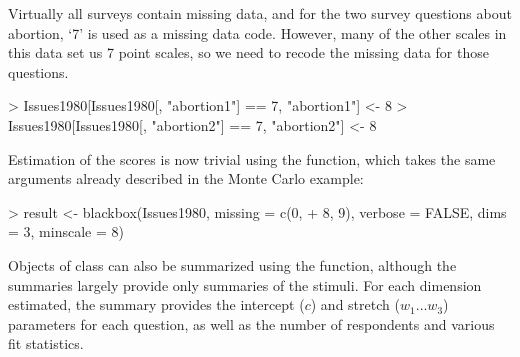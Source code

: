 \documentclass[nojss]{jss}
\begin{document}
Virtually all surveys contain missing data, and for the two survey questions about abortion, `7' is
used as a missing data code. However, many of the other scales in this data set us 7 point scales, so
we need to recode the missing data for those questions.

\begin{Schunk}
\begin{Sinput}
> Issues1980[Issues1980[, "abortion1"] == 7, "abortion1"] <- 8
> Issues1980[Issues1980[, "abortion2"] == 7, "abortion2"] <- 8
\end{Sinput}
\end{Schunk}

Estimation of the scores is now trivial using the  function, which takes the same
arguments already described in the Monte Carlo example:

\begin{Schunk}
\begin{Sinput}
> result <- blackbox(Issues1980, missing = c(0, 
+     8, 9), verbose = FALSE, dims = 3, minscale = 8)
\end{Sinput}
\end{Schunk}

Objects of class  can also be summarized using the  function, although
the summaries largely provide only summaries of the stimuli. For each dimension estimated, the summary
provides the intercept ($c$) and stretch ($w_1 \ldots w_3$) parameters for each question, as well
as the number of respondents and various fit statistics.
\end{document}

